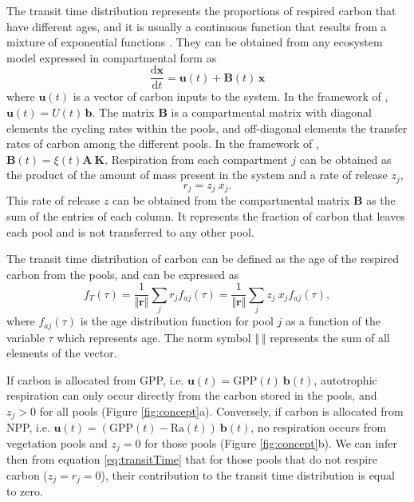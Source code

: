 \documentclass[bg, manuscript]{copernicus}
\begin{document}
The transit time distribution represents the proportions of respired carbon that have different ages, and it is usually a continuous function that results from a mixture of exponential functions \citep{Metzler2018MG}. They can be obtained from any ecosystem model expressed in compartmental form as
\begin{equation}
\frac{\mathrm{d}\bm{x}}{\mathrm{d}t} = \bm{u}(t) + \mathbf{B}(t) \, \bm{x}
\end{equation}
where $\bm{u}(t)$ is a vector of carbon inputs to the system. In the framework of \citet{Luo2017}, $\bm{u}(t) = U(t)\, \bm{b}$. The matrix $\mathbf{B}$ is a compartmental matrix with diagonal elements the cycling rates within the pools, and off-diagonal elements the transfer rates of carbon among the different pools. In the framework of \citet{Luo2017}, $\mathbf{B}(t) = \xi(t) \mathbf{A \ K}$. Respiration from each compartment $j$ can be obtained as the product of the amount of mass present in the system and a rate of release $z_j$, 
\begin{equation}
r_j = z_j \ x_j.
\end{equation}
This rate of release $z$ can be obtained from the compartmental matrix $\mathbf{B}$ as the sum of the entries of each column. It represents the fraction of carbon that leaves each pool and is not transferred to any other pool.

The transit time distribution of carbon can be defined as the age of the respired carbon from the pools, and can be expressed as \citep{Metzler2018MG}
\begin{equation} \label{eq:transitTime}
f_T(\tau) = \frac{1}{\Vert \bm{r} \Vert} \sum_j r_j f_{aj}(\tau) =  \frac{1}{\Vert \bm{r} \Vert} \sum_j z_j \ x_j f_{aj}(\tau),
\end{equation}
where $f_{aj} (\tau)$ is the age distribution function for pool $j$ as a function of the variable $\tau$ which represents age. The norm symbol $\Vert \ \Vert$ represents the sum of all elements of the vector.


 If carbon is allocated from GPP, i.e. $\bm{u}(t) = \mathrm{GPP}(t) \ \bm{b}(t) $, autotrophic respiration can only occur directly from the carbon stored in the pools, and $z_j > 0$ for all pools (Figure \ref{fig:concept}a). Conversely, if carbon is allocated from NPP, i.e. $\bm{u}(t) = (\mathrm{GPP}(t) - \mathrm{Ra}(t)) \ \bm{b}(t)$, no respiration occurs from vegetation pools and $z_j = 0$ for those pools (Figure \ref{fig:concept}b). We can infer then from equation \eqref{eq:transitTime} that for those pools that do not respire carbon ($z_j = r_j = 0$), their contribution to the transit time distribution is equal to zero.
\end{document}
